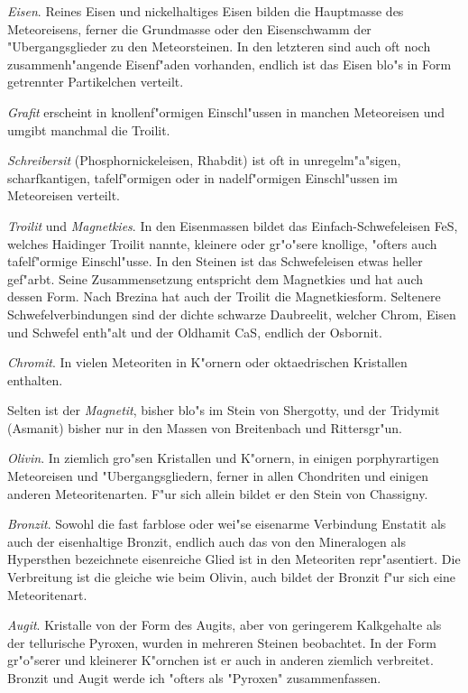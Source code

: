 \documentclass[a4paper, 11pt, oneside, polutonikogreek, german]{article}
\begin{document}
\emph{Eisen}. Reines Eisen und nickelhaltiges Eisen bilden die Hauptmasse des Meteoreisens, ferner die Grundmasse oder den Eisenschwamm der "Ubergangsglieder zu den Meteorsteinen. In den letzteren sind auch oft noch zusammenh"angende Eisenf"aden vorhanden, endlich ist das Eisen blo"s in Form getrennter Partikelchen verteilt.

\emph{Grafit} erscheint in knollenf"ormigen Einschl"ussen in manchen Meteoreisen und umgibt manchmal die Troilit.

\emph{Schreibersit} (Phosphornickeleisen, Rhabdit) ist oft in unregelm"a"sigen, scharfkantigen, tafelf"ormigen oder in nadelf"ormigen Einschl"ussen im Meteoreisen verteilt.

\emph{Troilit} und \emph{Magnetkies}. In den Eisenmassen bildet das Einfach-Schwefeleisen FeS, welches Haidinger Troilit nannte, kleinere oder gr"o"sere knollige, "ofters auch tafelf"ormige Einschl"usse. In den Steinen ist das Schwefeleisen etwas heller gef"arbt. Seine Zusammensetzung entspricht dem Magnetkies und hat auch dessen Form. Nach Brezina hat auch der Troilit die Magnetkiesform. Seltenere Schwefelverbindungen sind der dichte schwarze Daubreelit, welcher Chrom, Eisen und Schwefel enth"alt und der Oldhamit CaS, endlich der Osbornit.

\emph{Chromit}. In vielen Meteoriten in K"ornern oder oktaedrischen Kristallen enthalten.

Selten ist der \emph{Magnetit}, bisher blo"s im Stein von Shergotty, und der Tridymit (Asmanit) bisher nur in den Massen von Breitenbach und Rittersgr"un.

\emph{Olivin}. In ziemlich gro"sen Kristallen und K"ornern, in einigen porphyrartigen Meteoreisen und "Ubergangsgliedern, ferner in allen Chondriten und einigen anderen Meteoritenarten. F"ur sich allein bildet er den Stein von Chassigny.

\emph{Bronzit}. Sowohl die fast farblose oder wei"se eisenarme Verbindung Enstatit als auch der eisenhaltige Bronzit, endlich auch das von den Mineralogen als Hypersthen bezeichnete eisenreiche Glied ist in den Meteoriten repr"asentiert. Die Verbreitung ist die gleiche wie beim Olivin, auch bildet der Bronzit f"ur sich eine Meteoritenart.

\emph{Augit}. Kristalle von der Form des Augits, aber von geringerem Kalkgehalte als der tellurische Pyroxen, wurden in mehreren Steinen beobachtet. In der Form gr"o"serer und kleinerer K"ornchen ist er auch in anderen ziemlich verbreitet. Bronzit und Augit werde ich "ofters als "Pyroxen" zusammenfassen.
\end{document}
